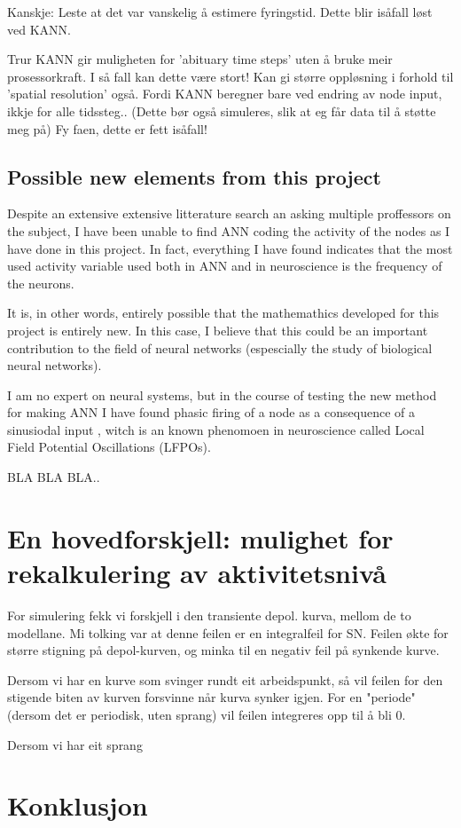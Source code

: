 	Kanskje: Leste at det var vanskelig å estimere fyringstid. Dette blir isåfall løst ved KANN.

	Trur KANN gir muligheten for 'abituary time steps' uten å bruke meir prosessorkraft. I så fall kan dette være stort! Kan gi større oppløsning i forhold til 'spatial resolution' også.
	Fordi KANN beregner bare ved endring av node input, ikkje for alle tidssteg..
	(Dette bør også simuleres, slik at eg får data til å støtte meg på)  	Fy faen, dette er fett isåfall!


	\subsection{Possible new elements from this project}
	Despite an extensive extensive litterature search an asking multiple proffessors on the subject, I have been unable to find ANN coding the activity of the nodes as I have done in this project.
	In fact, everything I have found indicates that the most used activity variable used both in ANN and in neuroscience is the frequency of the neurons.
	
	It is, in other words, entirely possible that the mathemathics developed for this project is entirely new. 
	In 	this case, I believe that this could be an important contribution to the field of neural networks (espescially the study of biological neural networks).

	I am no expert on neural systems, but in the course of testing the new method for making ANN I have found phasic firing of a node as a consequence of a sinusiodal input %
	, witch is an known phenomoen in neuroscience called Local Field Potential Oscillations (LFPOs).
	
	BLA BLA BLA..

	\section{En hovedforskjell: mulighet for rekalkulering av aktivitetsnivå}
	For simulering fekk vi forskjell i den transiente depol. kurva, mellom de to modellane.
	Mi tolking var at denne feilen er en integralfeil for SN. Feilen økte for større stigning på depol-kurven, og minka til en negativ feil på synkende kurve.
	
	Dersom vi har en kurve som svinger rundt eit arbeidspunkt, så vil feilen for den stigende biten av kurven forsvinne når kurva synker igjen. For en "periode" (dersom det er periodisk, uten sprang) vil feilen integreres opp til å bli 0.

	Dersom vi har eit sprang 


	\section{ Konklusjon }
